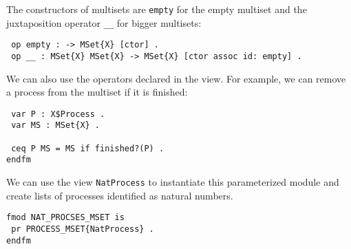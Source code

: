 The constructors of multisets are \verb"empty" for the empty multiset and
the juxtaposition operator \verb"__" for bigger multisets:

{\codesize
\begin{verbatim}
 op empty : -> MSet{X} [ctor] .
 op __ : MSet{X} MSet{X} -> MSet{X} [ctor assoc id: empty] .
\end{verbatim}
}

We can also use the operators declared in the view. For example, we can remove
a process from the multiset if it is finished: 

{\codesize
\begin{verbatim}
 var P : X$Process .
 var MS : MSet{X} .
 
 ceq P MS = MS if finished?(P) .
endfm
\end{verbatim}
}

We can use the view \verb"NatProcess" to instantiate this parameterized module
and create lists of processes identified as natural numbers.

{\codesize
\begin{verbatim}
fmod NAT_PROCSES_MSET is
 pr PROCESS_MSET{NatProcess} .
endfm
\end{verbatim}
}










